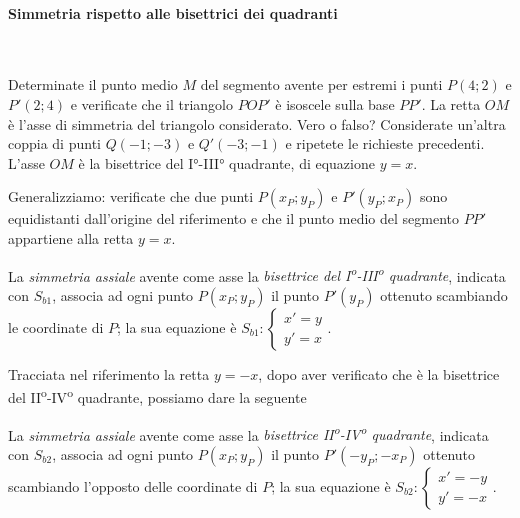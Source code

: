 \paragraph{Simmetria rispetto alle bisettrici dei quadranti}
~

\begin{exrig}
\begin{esempio}
Determinate il punto medio $M$ del segmento avente per estremi i punti $P(4;2)$ e $P'(2;4)$ e verificate che il triangolo $POP'$ è isoscele sulla base $PP'$. 
La retta $OM$ è l'asse di simmetria del triangolo considerato. Vero o falso? 
Considerate un'altra coppia di punti $Q(-1;-3)$ e $Q'(-3;-1)$ e ripetete le richieste precedenti.
L'asse $OM$ è la bisettrice del I°-III° quadrante, di equazione $y=x$.
\end{esempio}
\end{exrig}

Generalizziamo: verificate che due punti $P(x_P;y_P)$ e $P'(y_{P};x_{P})$ sono equidistanti dall'origine del riferimento e che il punto medio del segmento $PP'$ appartiene alla retta $y=x$.

\begin{definizione}
La \emph{simmetria assiale} avente come asse la \emph{bisettrice del I\textsuperscript{o}-III\textsuperscript{o} quadrante}, indicata con $S_{b1}$, associa ad ogni punto $P(x_P;y_P)$ il punto $P'(y_P)$ ottenuto scambiando le coordinate di $P$; la sua equazione è $S_{b1}:\begin{cases}x'=y\\y'=x \end{cases}$.
\end{definizione}

Tracciata nel riferimento la retta $y=-x$, dopo aver verificato che è la bisettrice del II\textsuperscript{o}-IV\textsuperscript{o} quadrante, possiamo dare la seguente

\begin{definizione}
La \emph{simmetria assiale} avente come asse la \emph{bisettrice II\textsuperscript{o}-IV\textsuperscript{o} quadrante}, indicata con $S_{b2}$, associa ad ogni punto $P(x_P;y_P)$ il punto $P'(-y_P;-x_P)$ ottenuto scambiando l'opposto delle coordinate di $P$; la sua equazione è $S_{b2}:\begin{cases}x'=-y\\y'=-x \end{cases}$.
\end{definizione}

